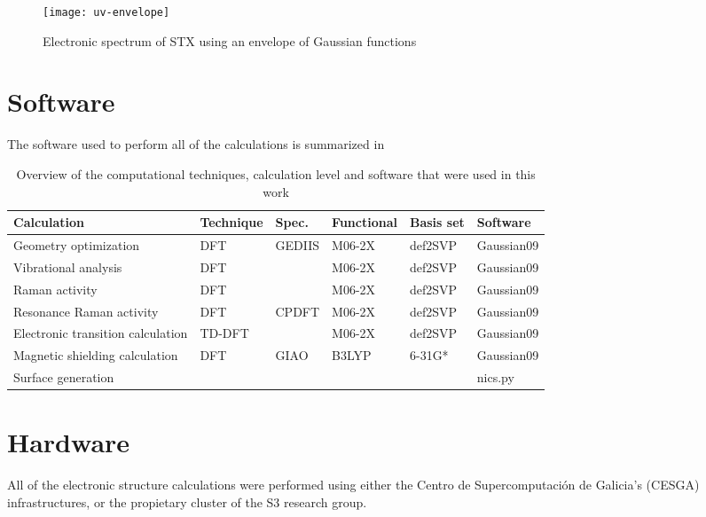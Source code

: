\begin{figure}
    \centering
    \texttt{[image: uv-envelope]}
    \caption[Electronic spectrum with Gaussian envelopes]{Electronic spectrum of STX using an envelope of Gaussian functions}
\end{figure}


\section{Software}

The software used to perform all of the calculations is summarized in 

\begin{table*}[h]
    \centering
    \caption[Overview of techniques, level and software]{Overview of the computational techniques, calculation level and software that were used in this work}
    \begin{tabular}{@{}llllll@{}}
        \toprule
        Calculation & Technique & Spec. & Functional & Basis set & Software \\
        \midrule
        Geometry optimization                   & DFT       & GEDIIS    & M06-2X & def2SVP & Gaussian09 \\
        Vibrational analysis                    & DFT       &           & M06-2X & def2SVP & Gaussian09 \\
        Raman activity                          & DFT       &           & M06-2X & def2SVP & Gaussian09 \\
        Resonance Raman activity                & DFT       & CPDFT     & M06-2X & def2SVP & Gaussian09 \\
        Electronic transition calculation       & TD-DFT    &           & M06-2X & def2SVP & Gaussian09 \\
        Magnetic shielding calculation          & DFT       & GIAO      & B3LYP  & 6-31G*  & Gaussian09 \\
        Surface generation                      &           &           & & & nics.py \\
        \bottomrule
    \end{tabular}
\end{table*}


\section{Hardware}
All of the electronic structure calculations were performed using either the Centro de Supercomputación de Galicia's (CESGA) infrastructures, or the propietary cluster of the S3 research group.

